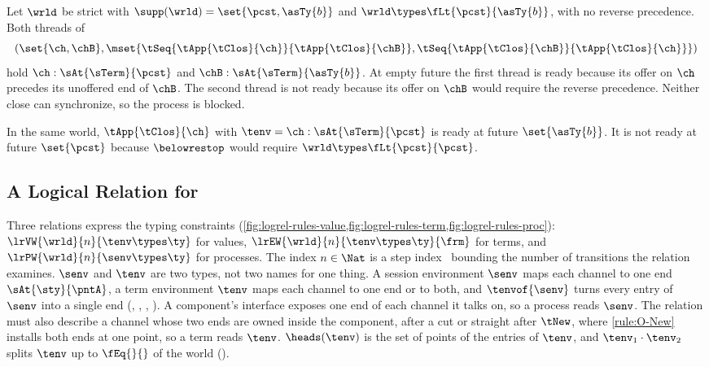 \begin{example}
  Let $\wrld$ be strict with $\supp(\wrld)=\set{\pcst,\asTy{b}}$ and
  $\wrld\types\fLt{\pcst}{\asTy{b}}$, with no reverse precedence.
  Both threads of
  \[
    (\set{\ch,\chB},\mset{
      \tSeq{\tApp{\tClos}{\ch}}{\tApp{\tClos}{\chB}},
      \tSeq{\tApp{\tClos}{\chB}}{\tApp{\tClos}{\ch}}})
  \]
  hold $\ch:\sAt{\sTerm}{\pcst}$ and $\chB:\sAt{\sTerm}{\asTy{b}}$.
  At empty future the first thread is ready because its offer on $\ch$
  precedes its unoffered end of $\chB$. The second thread is not ready
  because its offer on $\chB$ would require the reverse precedence.
  Neither close can synchronize, so the process is blocked.
\end{example}

\begin{example}
  In the same world, $\tApp{\tClos}{\ch}$ with
  $\tenv=\ch:\sAt{\sTerm}{\pcst}$ is ready at future
  $\set{\asTy{b}}$. It is not ready at future $\set{\pcst}$ because
  $\belowrestop$ would require $\wrld\types\fLt{\pcst}{\pcst}$.
\end{example}

\subsection{A Logical Relation for \OurLang}
\label{sec:logicalRelation:relation}

Three relations express the typing constraints
(\cref{fig:logrel-rules-value,fig:logrel-rules-term,fig:logrel-rules-proc}):
$\lrVW{\wrld}{n}{\tenv \types \ty}$ for values,
$\lrEW{\wrld}{n}{\tenv \types \ty}{\frm}$ for terms, and
$\lrPW{\wrld}{n}{\senv \types \ty}$ for processes.
The index $n \in \Nat$ is a step index~\cite{Ahmed06} bounding the
number of transitions the relation examines.
$\senv$ and $\tenv$ are two types, not two names for one thing. A
session environment $\senv$ maps each channel to one end
$\sAt{\sty}{\pntA}$, a term environment $\tenv$ maps each channel to one
end or to both, and $\tenvof{\senv}$ turns every entry of $\senv$ into a
single end (, , , ). A
component's interface exposes one end of each channel it talks on, so a
process reads $\senv$. The relation must also describe a channel whose
two ends are owned inside the component, after a cut or straight after
$\tNew$, where \ref{rule:O-New} installs both ends at one point, so a
term reads $\tenv$. $\heads(\tenv)$ is the set of points of the
entries of $\tenv$, and $\tenv_1 \cdot \tenv_2$ splits $\tenv$ up to
$\fEq{}{}$ of the world ().

